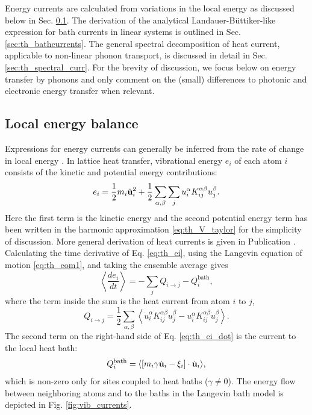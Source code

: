 Energy currents are calculated from variations in the local energy as discussed below in Sec. \ref{sec:th_energybalance}. The derivation of the analytical Landauer-B\"uttiker-like expression for bath currents in linear systems is outlined in Sec. \ref{sec:th_bathcurrents}. The general spectral decomposition of heat current, applicable to non-linear phonon transport, is discussed in detail in Sec. \ref{sec:th_spectral_curr}. For the brevity of discussion, we focus below on energy transfer by phonons and only comment on the (small) differences to photonic and electronic energy transfer when relevant. 




\subsection{Local energy balance}
\label{sec:th_energybalance}
Expressions for energy currents can generally be inferred from the rate of change in local energy \cite{hardy63}. In lattice heat transfer, vibrational energy $e_i$ of each atom $i$ consists of the kinetic and potential energy contributions:
\begin{equation}
 e_i = \frac{1}{2}m_i\dot{\mathbf{u}}_i^2 + \frac{1}{2} \sum_{\alpha,\beta}\sum_j u_i^{\alpha} K_{ij}^{\alpha\beta} u_j^{\beta} . \label{eq:th_ei}
\end{equation}
Here the first term is the kinetic energy and the second potential energy term has been written in the harmonic approximation \eqref{eq:th_V_taylor} for the simplicity of discussion. More general derivation of heat currents is given in Publication . Calculating the time derivative of Eq. \eqref{eq:th_ei}, using the Langevin equation of motion \eqref{eq:th_eom1}, and taking the ensemble average gives
\begin{equation}
 \left\langle \frac{de_i}{dt} \right\rangle =  -\sum_j  Q_{i\to j} -  Q_i^{\textrm{bath}} , \label{eq:th_ei_dot}
\end{equation}
where the term inside the sum is the heat current from atom $i$ to $j$,
\begin{equation}
 Q_{i \to j} = \frac{1}{2} \sum_{\alpha,\beta} \left\langle \dot{u}_i^{\alpha}K_{ij}^{\alpha\beta} u_j^{\beta} - u_i^{\alpha} K_{ij}^{\alpha\beta} \dot{u}_j^{\beta} \right\rangle. \label{eq:th_Qij}
\end{equation}
The second term on the right-hand side of Eq. \eqref{eq:th_ei_dot} is the current to the local heat bath:
\begin{equation}
 Q_i^{\textrm{bath}} = \langle [m_i\gamma \dot{\mathbf{u}}_i-\xi_i] \cdot \dot{\mathbf{u}}_i \rangle, \label{eq:th_Qibath}
\end{equation}
which is non-zero only for sites coupled to heat baths ($\gamma\neq 0$). The energy flow between neighboring atoms and to the baths in the Langevin bath model is depicted in Fig. \ref{fig:vib_currents}. 

